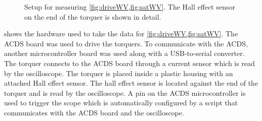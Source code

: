 \begin{figure}[htb!]
    \centering
    \caption{Setup for measuring \cref{fig:driveWV,fig:satWV}. The Hall effect sensor on the end of the torquer is shown in detail.}
    \label{fig:WVsetup}
\end{figure}

 shows the hardware used to take the data for \cref{fig:driveWV,fig:satWV}. The \ac{ACDS} board was used to drive the torquers. To communicate with the \ac{ACDS}, another microcontroller board was used along with a \ac{USB}-to-serial converter. The torquer connects to the \ac{ACDS} board through a current sensor which is read by the oscilloscope. The torquer is placed inside a plastic housing with an attached Hall effect sensor. The hall effect sensor is located against the end of the torquer and is read by the oscilloscope. A pin on the \ac{ACDS} microcontroller is  used to trigger the scope which is automatically configured by a \matlab script that communicates with the \ac{ACDS} board and the oscilloscope.

